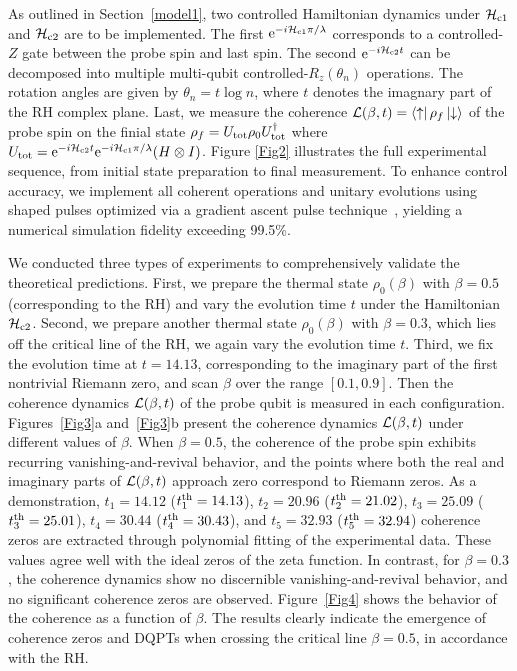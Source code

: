 \documentclass[aps,pra,twocolumn,superscriptaddress,preprintnumbers,amsmath,amssymb]{revtex4-2}
\begin{document}
As outlined in Section~\ref{model1}, two controlled Hamiltonian dynamics under $\mathcal{H}_{\rm c1}$ and $\mathcal{H}_{\rm c2}$  are to be implemented. The first $\text{e}^{-i\mathcal{H}_{\rm c1} \pi/\lambda}$ corresponds to a controlled-$Z$ gate between the probe spin and last spin. The second $\text{e}^{-i\mathcal{H}_{\rm c2} t}$ can be decomposed into multiple  multi-qubit controlled-$R_z(\theta_n)$ operations. The rotation angles are given by $\theta_n=t\log n$, where $t$ denotes the imagnary part of the RH complex plane. Last, we measure the coherence $\mathcal{L}(\beta,t)=\bra{\uparrow}\rho_f\ket{\downarrow}$ of the probe spin on the finial state $\rho_f=U_{\rm tot}\rho_0U^\dagger_{\rm tot}$ where $U_{\rm tot}=\text{e}^{-i\mathcal{H}_{\rm c2} t}\text{e}^{-i\mathcal{H}_{\rm c1} \pi/\lambda}(H\otimes I)$. Figure \ref{Fig2} illustrates the full experimental sequence, from initial state preparation to final measurement. To enhance control accuracy, we implement all coherent operations and unitary evolutions using shaped pulses optimized via a gradient ascent pulse technique~\cite{exp4}, yielding a numerical simulation fidelity exceeding 99.5\%. 



We conducted three types of experiments to comprehensively validate the theoretical predictions. First, we prepare the thermal state $\rho_0(\beta)$ with $\beta=0.5$ (corresponding to the RH) and vary the evolution time 
$t$ under the Hamiltonian $\mathcal{H}_{\rm c2}$. Second, we prepare another thermal state $\rho_0(\beta)$ with $\beta=0.3$, which lies off the critical line of the RH, we again vary the evolution time $t$. Third, we fix the evolution time at $t=14.13$, corresponding to the imaginary part of the first nontrivial Riemann zero, and scan $\beta$ over the range $[0.1, 0.9]$. Then the coherence dynamics ${\cal L}(\beta, t)$ of the probe qubit is measured in each configuration. Figures~\ref{Fig3}a and~\ref{Fig3}b present the coherence dynamics ${\cal L}(\beta, t)$ under different values of $\beta$. When $\beta=0.5$, the coherence of the probe spin exhibits recurring vanishing-and-revival behavior, and the points where both the real and imaginary parts of ${\cal L}(\beta, t)$ approach zero correspond to Riemann zeros. As a demonstration, $t_1=14.12$ ($t_1^{\rm th}=14.13$), $t_2=20.96$ ($t_2^{\rm th}=21.02$), $t_3=25.09$ ($t_3^{\rm th}=25.01$), $t_4=30.44$ ($t_4^{\rm th}=30.43$), and $t_5=32.93$ ($t_5^{\rm th}=32.94$) coherence zeros are extracted through polynomial fitting  of the experimental data. These values agree well with the ideal zeros of the zeta function. In contrast, for $\beta=0.3$, the coherence dynamics show no discernible vanishing-and-revival behavior, and no significant coherence zeros are observed. Figure~\ref{Fig4} shows the behavior of the coherence as a function of $\beta$. The results clearly indicate the emergence of coherence zeros  and  DQPTs  when crossing the critical line $\beta=0.5$, in accordance with the RH.
\end{document}
